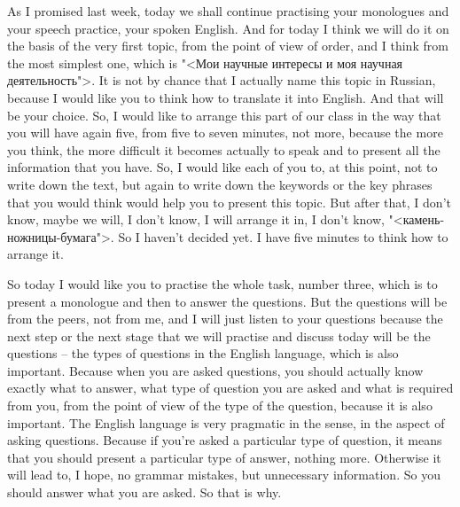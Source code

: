 \documentclass[main.tex]{subfiles}
\begin{document}

As I promised last week, today we shall continue practising your monologues and your speech practice, your spoken English.
And for today I think we will do it on the basis of the very first topic, from the point of view of order, and I think from the most simplest one, which is "<Мои научные интересы и моя научная деятельность">.
It is not by chance that I actually name this topic in Russian, because I would like you to think how to translate it into English.
And that will be your choice.
So, I would like to arrange this part of our class in the way that you will have again five, from five to seven minutes, not more, because the more you think, the more difficult it becomes actually to speak and to present all the information that you have.
So, I would like each of you to, at this point, not to write down the text, but again to write down the keywords or the key phrases that you would think would help you to present this topic.
But after that, I don't know, maybe we will, I don't know, I will arrange it in, I don't know, "<камень-ножницы-бумага">.
So I haven't decided yet.
I have five minutes to think how to arrange it.

So today I would like you to practise the whole task, number three, which is to present a monologue and then to answer the questions.
But the questions will be from the peers, not from me, and I will just listen to your questions because the next step or the next stage that we will practise and discuss today will be the questions -- the types of questions in the English language, which is also important.
Because when you are asked questions, you should actually know exactly what to answer, what type of question you are asked and what is required from you, from the point of view of the type of the question, because it is also important.
The English language is very pragmatic in the sense, in the aspect of asking questions.
Because if you're asked a particular type of question, it means that you should present a particular type of answer, nothing more.
Otherwise it will lead to, I hope, no grammar mistakes, but unnecessary information.
So you should answer what you are asked.
So that is why.
\end{document}
